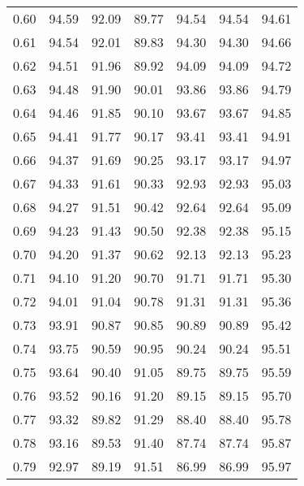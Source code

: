 \begin{tabular}{|c|c|c|c|c|c|c|}
      0.60 &     94.59 &     92.09 &      89.77 &   94.54 &      94.54 &         94.61 \\
      0.61 &     94.54 &     92.01 &      89.83 &   94.30 &      94.30 &         94.66 \\
      0.62 &     94.51 &     91.96 &      89.92 &   94.09 &      94.09 &         94.72 \\
      0.63 &     94.48 &     91.90 &      90.01 &   93.86 &      93.86 &         94.79 \\
      0.64 &     94.46 &     91.85 &      90.10 &   93.67 &      93.67 &         94.85 \\
      0.65 &     94.41 &     91.77 &      90.17 &   93.41 &      93.41 &         94.91 \\
      0.66 &     94.37 &     91.69 &      90.25 &   93.17 &      93.17 &         94.97 \\
      0.67 &     94.33 &     91.61 &      90.33 &   92.93 &      92.93 &         95.03 \\
      0.68 &     94.27 &     91.51 &      90.42 &   92.64 &      92.64 &         95.09 \\
      0.69 &     94.23 &     91.43 &      90.50 &   92.38 &      92.38 &         95.15 \\
      0.70 &     94.20 &     91.37 &      90.62 &   92.13 &      92.13 &         95.23 \\
      0.71 &     94.10 &     91.20 &      90.70 &   91.71 &      91.71 &         95.30 \\
      0.72 &     94.01 &     91.04 &      90.78 &   91.31 &      91.31 &         95.36 \\
      0.73 &     93.91 &     90.87 &      90.85 &   90.89 &      90.89 &         95.42 \\
      0.74 &     93.75 &     90.59 &      90.95 &   90.24 &      90.24 &         95.51 \\
      0.75 &     93.64 &     90.40 &      91.05 &   89.75 &      89.75 &         95.59 \\
      0.76 &     93.52 &     90.16 &      91.20 &   89.15 &      89.15 &         95.70 \\
      0.77 &     93.32 &     89.82 &      91.29 &   88.40 &      88.40 &         95.78 \\
      0.78 &     93.16 &     89.53 &      91.40 &   87.74 &      87.74 &         95.87 \\
      0.79 &     92.97 &     89.19 &      91.51 &   86.99 &      86.99 &         95.97 \\

\end{tabular}
